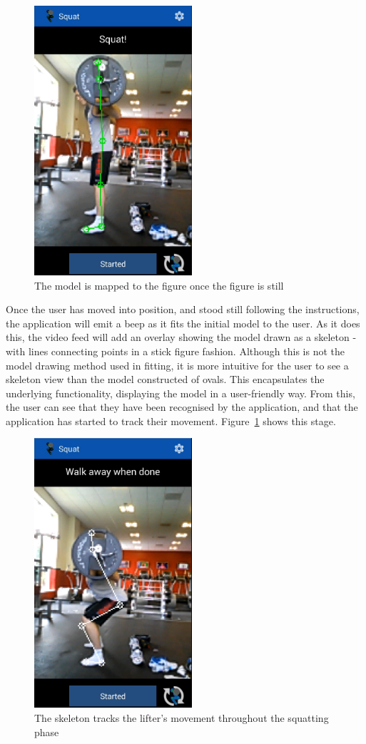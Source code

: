 \begin{figure}[H]
    \centering
	\includegraphics[height=10cm]{application/images/startsquatting}
\caption{The model is mapped to the figure once the figure is still}
\label{fig:startsquatting}
\end{figure}

Once the user has moved into position, and stood still following the instructions, the application will emit a beep as it fits the initial model to the user. As it does this, the video feed will add an overlay showing the model drawn as a skeleton - with lines connecting points in a stick figure fashion. Although this is not the model drawing method used in fitting, it is more intuitive for the user to see a skeleton view than the model constructed of ovals. This encapsulates the underlying functionality, displaying the model in a user-friendly way. From this, the user can see that they have been recognised by the application, and that the application has started to track their movement. Figure~\ref{fig:startsquatting} shows this stage.

\begin{figure}[H]
    \centering
	\includegraphics[height=10cm]{application/images/midsquat}
\caption{The skeleton tracks the lifter's movement throughout the squatting phase}
\label{fig:midsquat}
\end{figure}

